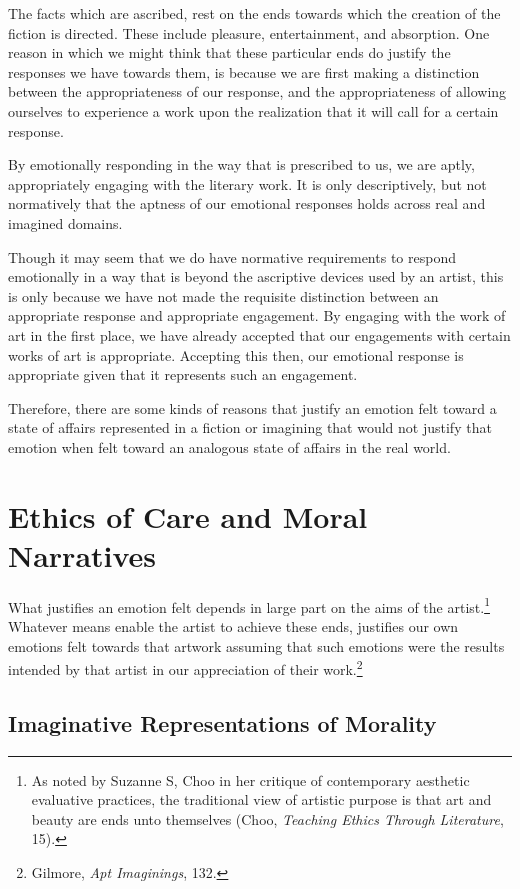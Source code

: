 \documentclass[phdthesis,12pt,final,a4paper]{wuthesis}
\theoremstyle{definition}
\theoremstyle{definition}
\theoremstyle{definition}
\theoremstyle{definition}
\theoremstyle{remark}
\begin{document}
The facts which are ascribed, rest on the ends towards which the creation of the fiction is directed. These include pleasure, entertainment, and absorption. One reason in which we might think that these particular ends do justify the responses we have towards them, is because we are first making a distinction between the appropriateness of our response, and the appropriateness of allowing ourselves to experience a work upon the realization that it will call for a certain response.

By emotionally responding in the way that is prescribed to us, we are aptly, appropriately engaging with the literary work. It is only descriptively, but not normatively that the aptness of our emotional responses holds across real and imagined domains.

Though it may seem that we do have normative requirements to respond emotionally in a way that is beyond the ascriptive devices used by an artist, this is only because we have not made the requisite distinction between an appropriate response and appropriate engagement. By engaging with the work of art in the first place, we have already accepted that our engagements with certain works of art is appropriate. Accepting this then, our emotional response is appropriate given that it represents such an engagement.

Therefore, there are some kinds of reasons that justify an emotion felt toward a state of affairs represented in a fiction or imagining that would not justify that emotion when felt toward an analogous state of affairs in the real world.

\section{Ethics of Care and Moral Narratives}\label{ethics-of-care-and-moral-narratives}

What justifies an emotion felt depends in large part on the aims of the artist.\footnote{As noted by Suzanne S, Choo in her critique of contemporary aesthetic evaluative practices, the traditional view of artistic purpose is that art and beauty are ends unto themselves (Choo, \emph{Teaching Ethics Through Literature}, 15).} Whatever means enable the artist to achieve these ends, justifies our own emotions felt towards that artwork assuming that such emotions were the results intended by that artist in our appreciation of their work.\footnote{Gilmore, \emph{Apt {Imaginings}}, 132.}

\subsection*{Imaginative Representations of Morality}\label{imaginative-representations-of-morality}
\end{document}
